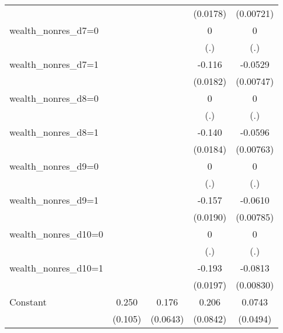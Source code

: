 \begin{table}[htbp]
\begin{tabular}{l*{4}{c}}
                &                  &                  & (0.0178)         &(0.00721)         \\
wealth\_nonres\_d7=0&                  &                  &        0         &        0         \\
                &                  &                  &      (.)         &      (.)         \\
wealth\_nonres\_d7=1&                  &                  &   -0.116\sym{***}&  -0.0529\sym{***}\\
                &                  &                  & (0.0182)         &(0.00747)         \\
wealth\_nonres\_d8=0&                  &                  &        0         &        0         \\
                &                  &                  &      (.)         &      (.)         \\
wealth\_nonres\_d8=1&                  &                  &   -0.140\sym{***}&  -0.0596\sym{***}\\
                &                  &                  & (0.0184)         &(0.00763)         \\
wealth\_nonres\_d9=0&                  &                  &        0         &        0         \\
                &                  &                  &      (.)         &      (.)         \\
wealth\_nonres\_d9=1&                  &                  &   -0.157\sym{***}&  -0.0610\sym{***}\\
                &                  &                  & (0.0190)         &(0.00785)         \\
wealth\_nonres\_d10=0&                  &                  &        0         &        0         \\
                &                  &                  &      (.)         &      (.)         \\
wealth\_nonres\_d10=1&                  &                  &   -0.193\sym{***}&  -0.0813\sym{***}\\
                &                  &                  & (0.0197)         &(0.00830)         \\
Constant        &    0.250\sym{**} &    0.176\sym{***}&    0.206\sym{**} &   0.0743         \\
                &  (0.105)         & (0.0643)         & (0.0842)         & (0.0494)         \\
\midrule

\end{tabular}
\end{table}
